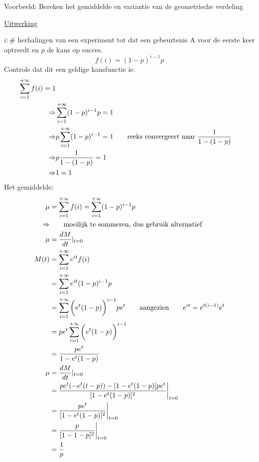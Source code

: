 \documentclass[12pt]{report}
\newcommand{\example}[2]{
      \hrulefill
      
      Voorbeeld: #1
      
      \underline{Uitwerking}
      
      #2
      
      \hrulefill
  }
\begin{document}
\example{
        Bereken het gemiddelde en variantie van de geometrische verdeling
    }{
        $i: \#$ herhalingen van een experiment tot dat een gebeurtenis A voor de eerste keer optreedt en $p$ de kans op succes.
        $$f(i) = (1 - p)^{i - 1}p$$
        Controle dat dit een geldige kansfunctie is:
        \begin{equation*}
         \begin{split}
                        \sum_{i = 1}^{+\infty} f(i) = 1 \\
          \Rightarrow & \sum_{i = 1}^{+\infty} (1 - p)^{i - 1}p = 1 \\
          \Rightarrow & p\sum_{i = 1}^{+\infty} (1 - p)^{i - 1} = 1 \qquad \hbox{reeks convergeert naar}\; \frac{1}{1 - (1-p)}\\ 
          \Rightarrow & p\frac{1}{1 - (1-p)} = 1 \\
          \Rightarrow & 1 = 1
         \end{split}
        \end{equation*}
        Het gemiddelde:
        \begin{equation*}
         \begin{split}
          \mu & = \sum_{i=1}^{+\infty} f(i) = \sum_{i = 1}^{+\infty} (1 - p)^{i - 1}p \\
          \Rightarrow & \qquad \hbox{moeilijk te sommeren, dus gebruik alternatief} \\
          \mu & = \frac{dM}{dt}|_{t=0} \\
          M(t) & = \sum_{i = 1}^{+\infty}e^{it}f(i) \\
               & = \sum_{i = 1}^{+\infty}e^{it}(1 - p)^{i - 1}p \\
               & = \sum_{i = 1}^{+\infty} \bigg(e^{t}(1 - p)\bigg)^{i - 1}pe^{t} \qquad \hbox{aangezien} \qquad e^{it} = e^{t(i - 1)}e^{t} \\
               & = pe^{t}\sum_{i = 1}^{+\infty} \bigg(e^{t}(1 - p)\bigg)^{i - 1} \\
               & = \frac{pe^{t}}{1 - e^t(1 - p)} \\
          \mu & = \frac{dM}{dt}|_{t=0} \\
              & = \frac{pe^{t}(-e^t(t - p)) - [1 - e^t(1 - p)]pe^t}{[1 - e^t(1 - p)]^2}\bigg|_{t = 0} \\
              & = \frac{pe^{t}}{[1 - e^t(1 - p)]^2}\bigg|_{t = 0} \\
              & = \frac{p}{[1 - 1 - p]^2}\bigg|_{t = 0} \\
              & = \frac{1}{p}

\end{split}
\end{equation*}}
\end{document}

